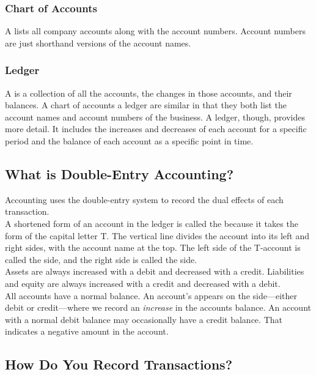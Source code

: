 \documentclass{article}
\begin{document}
\subsubsection{Chart of Accounts}

A  lists all company accounts along with the account numbers. Account numbers are just shorthand versions of the account names. 

\subsubsection{Ledger}

A  is a collection of all the accounts, the changes in those accounts, and their balances. A chart of accounts a ledger are similar in that they both list the account names and account numbers of the business. A ledger, though, provides more detail. It includes the increases and decreases of each account for a specific period and the balance of each account as a specific point in time. 

\subsection{What is Double-Entry Accounting?}

Accounting uses the double-entry system to record the dual effects of each transaction. \\ 

A shortened form of an account in the ledger is called the  because it takes the form of the capital letter T. The vertical line divides the account into its left and right sides, with the account name at the top. The left side of the T-account is called the  side, and the right side is called the  side. \\ 

Assets are always increased with a debit and decreased with a credit. Liabilities and equity are always increased with a credit and decreased with a debit. \\ 

All accounts have a normal balance. An account's  appears on the side---either debit or credit---where we record an \emph{increase} in the accounts balance. An account with a normal debit balance may occasionally have a credit balance. That indicates a negative amount in the account. 

\subsection{How Do You Record Transactions?}
\end{document}
